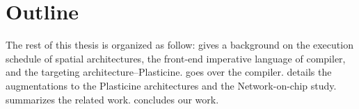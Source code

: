 \section{Outline}
The rest of this thesis is organized as follow:
 gives a background on the execution schedule of spatial
architectures, the front-end imperative language of \name compiler, and the targeting architecture--Plasticine.
 goes over the \name compiler.
 details the augmentations to the Plasticine architectures and the
Network-on-chip study.
 summarizes the related work.
 concludes our work.
